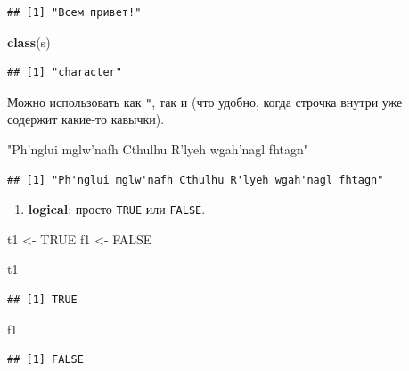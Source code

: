 \documentclass[]{book}
\newenvironment{Shaded}{\begin{snugshade}}{\end{snugshade}}
\newcommand{\KeywordTok}[1]{\textcolor[rgb]{0.13,0.29,0.53}{\textbf{#1}}}
\newcommand{\StringTok}[1]{\textcolor[rgb]{0.31,0.60,0.02}{#1}}
\newcommand{\OtherTok}[1]{\textcolor[rgb]{0.56,0.35,0.01}{#1}}
\newcommand{\NormalTok}[1]{#1}
\providecommand{\tightlist}{%
  \setlength{\itemsep}{0pt}\setlength{\parskip}{0pt}}
\begin{document}
\begin{verbatim}
## [1] "Всем привет!"
\end{verbatim}

\begin{Shaded}
\begin{Highlighting}[]
\KeywordTok{class}\NormalTok{(s)}
\end{Highlighting}
\end{Shaded}

\begin{verbatim}
## [1] "character"
\end{verbatim}

Можно использовать как \texttt{"}, так и \texttt{\textquotesingle{}}
(что удобно, когда строчка внутри уже содержит какие-то кавычки).

\begin{Shaded}
\begin{Highlighting}[]
\StringTok{"Ph'nglui mglw'nafh Cthulhu R'lyeh wgah'nagl fhtagn"}
\end{Highlighting}
\end{Shaded}

\begin{verbatim}
## [1] "Ph'nglui mglw'nafh Cthulhu R'lyeh wgah'nagl fhtagn"
\end{verbatim}

\begin{enumerate}
\def\labelenumi{\arabic{enumi}.}
\setcounter{enumi}{1}
\tightlist
\item
  \textbf{logical}: просто \texttt{TRUE} или \texttt{FALSE}.
\end{enumerate}

\begin{Shaded}
\begin{Highlighting}[]
\NormalTok{t1 <-}\StringTok{ }\OtherTok{TRUE}
\NormalTok{f1 <-}\StringTok{ }\OtherTok{FALSE}

\NormalTok{t1}
\end{Highlighting}
\end{Shaded}

\begin{verbatim}
## [1] TRUE
\end{verbatim}

\begin{Shaded}
\begin{Highlighting}[]
\NormalTok{f1}
\end{Highlighting}
\end{Shaded}

\begin{verbatim}
## [1] FALSE
\end{verbatim}
\end{document}
